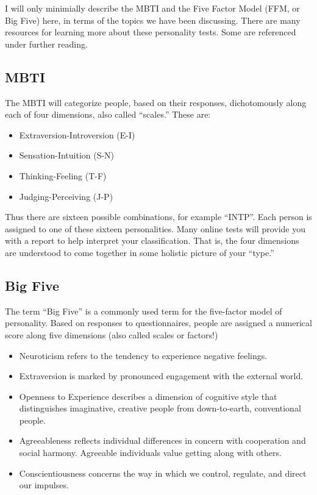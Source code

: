 \documentclass[
  openany]{book}
\providecommand{\tightlist}{%
  \setlength{\itemsep}{0pt}\setlength{\parskip}{0pt}}
\begin{document}
I will only minimially describe the MBTI and the Five Factor Model (FFM, or Big Five) here, in terms of the topics we have been discussing. There are many resources for learning more about these personality tests. Some are referenced under further reading.

\hypertarget{mbti}{%
\subsection*{MBTI}\label{mbti}}

The MBTI will categorize people, based on their responses, dichotomously along each of four dimensions, also called ``scales.'' These are:

\begin{itemize}
\tightlist
\item
  Extraversion-Introversion (E-I)
\item
  Sensation-Intuition (S-N)
\item
  Thinking-Feeling (T-F)
\item
  Judging-Perceiving (J-P)
\end{itemize}

Thus there are sixteen possible combinations, for example ``INTP''. Each person is assigned to one of these sixteen personalities. Many online tests will provide you with a report to help interpret your classification. That is, the four dimensions are understood to come together in some holistic picture of your ``type.''

\hypertarget{big-five}{%
\subsection*{Big Five}\label{big-five}}

The term ``Big Five'' is a commonly used term for the five-factor model of personality. Based on responses to questionnaires, people are assigned a numerical score along five dimensions (also called scales or factors!)

\begin{itemize}
\tightlist
\item
  Neuroticism refers to the tendency to experience negative feelings.
\item
  Extraversion is marked by pronounced engagement with the external world.
\item
  Openness to Experience describes a dimension of cognitive style that distinguishes imaginative, creative people from down-to-earth, conventional people.
\item
  Agreeableness reflects individual differences in concern with cooperation and social harmony. Agreeable individuals value getting along with others.
\item
  Conscientiousness concerns the way in which we control, regulate, and direct our impulses.
\end{itemize}
\end{document}
